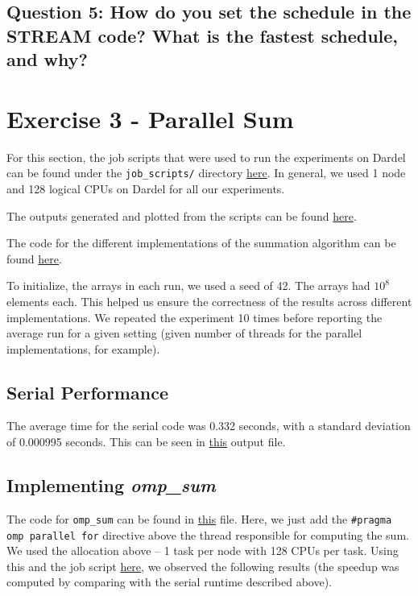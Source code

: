 \documentclass[a4paper,10pt]{article}
\begin{document}
\subsection{Question 5: How do you set the schedule in the STREAM code? What is the fastest schedule, and why?}

\section{Exercise 3 - Parallel Sum}
For this section, the job scripts that were used to run the experiments on Dardel can be found under the \verb|job_scripts/| directory \href{https://github.com/paulmyr/DD2356-MethodsHPC/tree/master/3_open_mp/exercise3/job_scripts}{here}. In general, we used 1 node and 128 logical CPUs on Dardel for all our experiments. 

The outputs generated and plotted from the scripts can be found \href{https://github.com/paulmyr/DD2356-MethodsHPC/tree/master/3_open_mp/exercise3/outputs}{here}. 

The code for the different implementations of the summation algorithm can be found \href{https://github.com/paulmyr/DD2356-MethodsHPC/tree/master/3_open_mp/exercise3}{here}.

To initialize, the arrays in each run, we used a seed of 42. The arrays had $10^8$ elements each. This helped us ensure the correctness of the results across different implementations. We repeated the experiment 10 times before reporting the average run for a given setting (given number of threads for the parallel implementations, for example). 

\subsection{Serial Performance}
The average time for the serial code was 0.332 seconds, with a standard deviation of 0.000995 seconds. This can be seen in \href{https://github.com/paulmyr/DD2356-MethodsHPC/blob/master/3_open_mp/exercise3/outputs/serial_output.txt}{this} output file.

\subsection{Implementing \textit{omp\_sum}}
The code for \verb|omp_sum| can be found in \href{https://github.com/paulmyr/DD2356-MethodsHPC/blob/master/3_open_mp/exercise3/omp_sum.c}{this} file. Here, we just add the \verb|#pragma omp parallel for| directive above the thread responsible for computing the sum. We used the allocation above -- 1 task per node with 128 CPUs per task. Using this and the job script \href{https://github.com/paulmyr/DD2356-MethodsHPC/blob/master/3_open_mp/exercise3/job_scripts/omp_sum_job.sh}{here}, we observed the following results (the speedup was computed by comparing with the serial runtime described above). 
\end{document}
